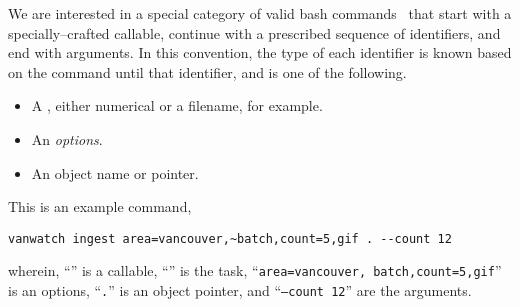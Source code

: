 We are interested in a special category of valid bash commands~\cite{shell_syntax} that start with a specially--crafted callable, continue with a prescribed sequence of identifiers, and end with arguments. In this convention, the type of each identifier is known based on the command until that identifier, and is one of the following.
%
\begin{itemize}
    \item A , either numerical or a filename, for example.
    \item An \emph{options}.
    \item An object name or pointer.
\end{itemize}
%
This is an example command,
%
\begin{verbatim}
vanwatch ingest area=vancouver,~batch,count=5,gif . --count 12
\end{verbatim}
%
wherein, ``'' is a callable, ``'' is the task, ``\texttt{area=vancouver,~batch,count=5,gif}'' is an options, ``\texttt{.}'' is an object pointer, and ``\texttt{--count 12}'' are the arguments.